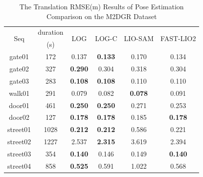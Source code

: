 \documentclass[letterpaper, 10 pt, conference]{ieeeconf}  %
\begin{document}
\begin{table}[htb!]
        \caption{The Translation RMSE(m) Results of Pose Estimation Comparison on the M2DGR Dataset}
        \centering
        \begin{tabular}{c|c|c|c|c|c}
                \toprule
                \multirow{2}{*}{Seq} & duration & \multirow{2}{*}{LOG} & \multirow{2}{*}{LOG-C} & \multirow{2}{*}{LIO-SAM} & \multirow{2}{*}{FAST-LIO2} \\
                                     & (s)      &                      &                        &                          &                            \\
                \midrule
                gate01               & 172      & 0.137                & \textbf{0.133}         & 0.170                    & 0.134                      \\
                gate02               & 327      & \textbf{0.290}       & 0.304                  & 0.318                    & 0.304                      \\
                gate03               & 283      & \textbf{0.108}       & \textbf{0.108}         & 0.110                    & 0.110                      \\
                walk01               & 291      & 0.079                & 0.082                  & \textbf{0.078}           & 0.091                      \\
                door01               & 461      & \textbf{0.250}       & \textbf{0.250}         & 0.271                    & 0.253                      \\
                door02               & 127      & \textbf{0.178}       & \textbf{0.178}         & 0.185                    & \textbf{0.178}             \\
                street01             & 1028     & \textbf{0.212}       & \textbf{0.212}         & 0.586                    & 0.221                      \\
                street02             & 1227     & 2.537                & \textbf{2.315}         & 3.619                    & 2.394                      \\
                street03             & 354      & \textbf{0.140}       & 0.146                  & 0.149                    & \textbf{0.140}             \\
                street04             & 858      & \textbf{0.525}       & 0.591                  & 1.022                    & 0.568                      \\

\end{tabular}
\end{table}
\end{document}

